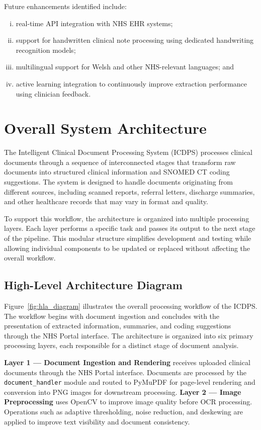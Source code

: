 Future enhancements identified include:
\begin{enumerate}[(i)]
    \item real-time API integration with NHS EHR systems;
    \item support for handwritten clinical note processing using dedicated handwriting recognition models;
    \item multilingual support for Welsh and other NHS-relevant languages; and
    \item active learning integration to continuously improve extraction performance using clinician feedback.
\end{enumerate}

\section{Overall System Architecture}

The Intelligent Clinical Document Processing System (ICDPS) processes clinical documents through a sequence of interconnected stages that transform raw documents into structured clinical information and SNOMED CT coding suggestions. The system is designed to handle documents originating from different sources, including scanned reports, referral letters, discharge summaries, and other healthcare records that may vary in format and quality.

To support this workflow, the architecture is organized into multiple processing layers. Each layer performs a specific task and passes its output to the next stage of the pipeline. This modular structure simplifies development and testing while allowing individual components to be updated or replaced without affecting the overall workflow.

\subsection{High-Level Architecture Diagram}

Figure~\ref{fig:hla_diagram} illustrates the overall processing workflow of the ICDPS. The workflow begins with document ingestion and concludes with the presentation of extracted information, summaries, and coding suggestions through the NHS Portal interface. The architecture is organized into six primary processing layers, each responsible for a distinct stage of document analysis.

\textbf{Layer 1 --- Document Ingestion and Rendering} receives uploaded clinical documents through the NHS Portal interface. Documents are processed by the \texttt{document\_handler} module and routed to PyMuPDF for page-level rendering and conversion into PNG images for downstream processing.
\textbf{Layer 2 --- Image Preprocessing} uses OpenCV to improve image quality before OCR processing. Operations such as adaptive thresholding, noise reduction, and deskewing are applied to improve text visibility and document consistency.

